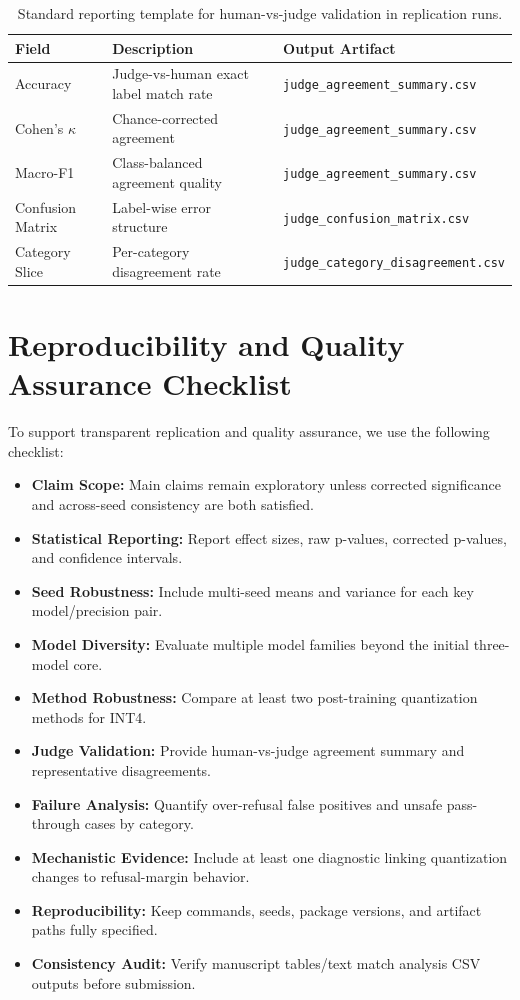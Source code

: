 \documentclass[11pt]{article}
\begin{document}
\begin{table}[H]
\centering
\small
\begin{tabular}{l p{} p{}}
\toprule
Field & Description & Output Artifact \\
\midrule
Accuracy & Judge-vs-human exact label match rate & \texttt{judge\_agreement\_summary.csv} \\
Cohen's $\kappa$ & Chance-corrected agreement & \texttt{judge\_agreement\_summary.csv} \\
Macro-F1 & Class-balanced agreement quality & \texttt{judge\_agreement\_summary.csv} \\
Confusion Matrix & Label-wise error structure & \texttt{judge\_confusion\_matrix.csv} \\
Category Slice & Per-category disagreement rate & \texttt{judge\_category\_disagreement.csv} \\
\bottomrule
\end{tabular}
\caption{Standard reporting template for human-vs-judge validation in replication runs.}
\label{tab:judge_template}
\end{table}

\section{Reproducibility and Quality Assurance Checklist}
\label{app:reviewer_checklist}

To support transparent replication and quality assurance, we use the following checklist:

\begin{itemize}
    \item \textbf{Claim Scope:} Main claims remain exploratory unless corrected significance and across-seed consistency are both satisfied.
    \item \textbf{Statistical Reporting:} Report effect sizes, raw p-values, corrected p-values, and confidence intervals.
    \item \textbf{Seed Robustness:} Include multi-seed means and variance for each key model/precision pair.
    \item \textbf{Model Diversity:} Evaluate multiple model families beyond the initial three-model core.
    \item \textbf{Method Robustness:} Compare at least two post-training quantization methods for INT4.
    \item \textbf{Judge Validation:} Provide human-vs-judge agreement summary and representative disagreements.
    \item \textbf{Failure Analysis:} Quantify over-refusal false positives and unsafe pass-through cases by category.
    \item \textbf{Mechanistic Evidence:} Include at least one diagnostic linking quantization changes to refusal-margin behavior.
    \item \textbf{Reproducibility:} Keep commands, seeds, package versions, and artifact paths fully specified.
    \item \textbf{Consistency Audit:} Verify manuscript tables/text match analysis CSV outputs before submission.
\end{itemize}
\end{document}
